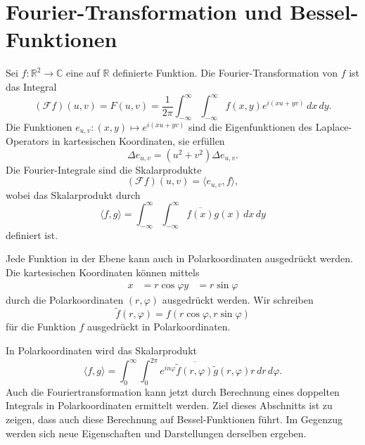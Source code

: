%
%
%
\section{Fourier-Transformation und Bessel-Funktionen
\label{buch:fourier:section:fourier-und-bessel}}

Sei $f\colon \mathbb{R}^2\to\mathbb{C}$ eine auf $\mathbb{R}$ definierte
Funktion.
Die Fourier-Transformation von $f$ ist das Integral
\begin{equation}
(\mathscr{F}f)(u,v)
=
F(u,v)
=
\frac{1}{2\pi}
\int_{-\infty}^\infty
\int_{-\infty}^\infty
f(x,y) e^{i(xu+yv)}
\,dx\,dy.
\label{buch:fourier:eqn:2dfourier}
\end{equation}
Die Funktionen $e_{u,v}\colon (x,y)\mapsto e^{i(xu+yv)}$
sind die Eigenfunktionen des Laplace-Operators in kartesischen Koordinaten,
sie erfüllen
\[
\Delta e_{u,v} = (u^2+v^2) \Delta e_{u,v}.
\]
Die Fourier-Integrale sind die Skalarprodukte
\[
(\mathscr{F}f)(u,v)
=
\langle
e_{u,v},
f
\rangle,
\]
wobei das Skalarprodukt durch
\[
\langle f,g\rangle
=
\int_{-\infty}^\infty
\int_{-\infty}^\infty
\overline{f(x)} g(x)
\,dx\,dy
\]
definiert ist.

Jede Funktion in der Ebene kann auch in Polarkoordinaten ausgedrückt werden.
Die kartesischen Koordinaten können mittels
\begin{align*}
x&=r\cos\varphi
y&=r\sin\varphi
\end{align*}
durch die Polarkoordinaten $(r,\varphi)$ ausgedrückt werden.
Wir schreiben
\[
\tilde{f}(r,\varphi)
=
f(r\cos\varphi,r\sin\varphi)
\]
für die Funktion $f$ ausgedrückt in Polarkoordinaten.

In Polarkoordinaten wird das Skalarprodukt
\[
\langle f,g\rangle
=
\int_0^\infty \int_{0}^{2\pi} e^{in\varphi}
\overline{
\tilde{f}(r,\varphi)
}
\tilde{g}(r,\varphi)
r\,dr\,d\varphi.
\]
Auch die Fouriertransformation kann jetzt durch Berechnung eines
doppelten Integrals in Polarkoordinaten ermittelt werden.
Ziel dieses Abschnitts ist zu zeigen, dass auch diese Berechnung auf
Bessel-Funktionen führt.
Im Gegenzug werden sich neue Eigenschaften und Darstellungen derselben
ergeben.


